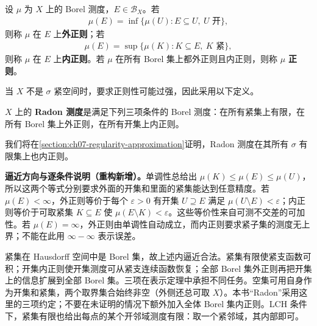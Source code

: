 \documentclass[../../main.tex]{subfiles}
\begin{document}
\begin{definition}\label{definition:ch07-regular-measure}
设 $\mu$ 为 $X$ 上的 Borel 测度，$E\in\mathscr B_X$。若
\begin{align*}
\mu(E)=\inf\{\mu(U):E\subseteq U,\ U\text{ 开}\},
\end{align*}
则称 $\mu$ 在 $E$ 上\textbf{外正则}；若
\begin{align*}
\mu(E)=\sup\{\mu(K):K\subseteq E,\ K\text{ 紧}\},
\end{align*}
则称 $\mu$ 在 $E$ 上\textbf{内正则}。若 $\mu$ 在所有 Borel 集上都外正则且内正则，则称 $\mu$ \textbf{正则}。
\end{definition}
当 $X$ 不是 $\sigma$ 紧空间时，要求正则性可能过强，因此采用以下定义。
\begin{definition}[Radon 测度]\label{definition:ch07-radon-measure}
$X$ 上的 \textbf{Radon 测度}是满足下列三项条件的 Borel 测度：在所有紧集上有限，在所有 Borel 集上外正则，在所有开集上内正则。
\end{definition}
我们将在\cref{section:ch07-regularity-approximation}证明，Radon 测度在其所有 $\sigma$ 有限集上也内正则。
\begin{remark}
\textbf{逼近方向与逐条件说明（重构新增）。}单调性总给出 $\mu(K)\leqslant\mu(E)\leqslant\mu(U)$，所以这两个等式分别要求外面的开集和里面的紧集能达到任意精度。若 $\mu(E)<\infty$，外正则等价于每个 $\varepsilon>0$ 有开集 $U\supseteq E$ 满足 $\mu(U\setminus E)<\varepsilon$；内正则等价于可取紧集 $K\subseteq E$ 使 $\mu(E\setminus K)<\varepsilon$。这些等价性来自可测不交差的可加性。若 $\mu(E)=\infty$，外正则由单调性自动成立，而内正则要求紧子集的测度无上界；不能在此用 $\infty-\infty$ 表示误差。

紧集在 Hausdorff 空间中是 Borel 集，故上述内逼近合法。紧集有限使紧支函数可积；开集内正则使开集测度可从紧支连续函数恢复；全部 Borel 集外正则再把开集上的信息扩展到全部 Borel 集。三项在表示定理中承担不同任务。空集可用自身作为开集和紧集，两个取界集合始终非空（外侧还总可取 $X$）。本书“Radon”采用这里的三项约定；不要在未证明的情况下额外加入全体 Borel 集内正则。LCH 条件下，紧集有限也给出每点的某个开邻域测度有限：取一个紧邻域，其内部即可。
\end{remark}
\end{document}
